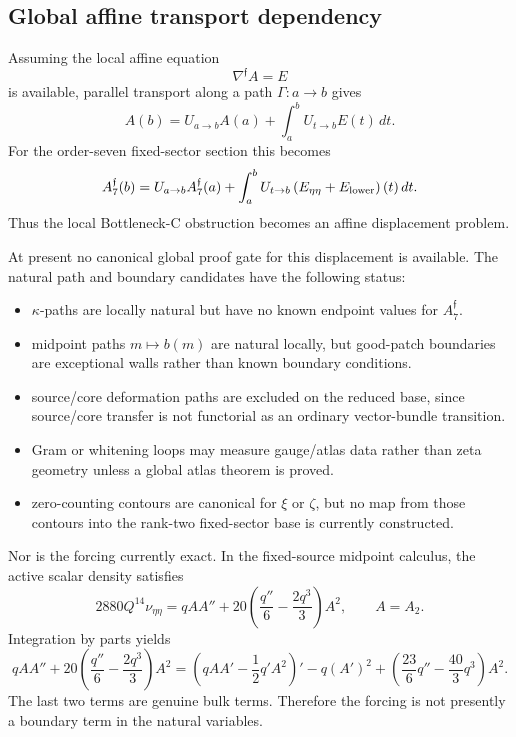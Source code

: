 \documentclass[11pt,a4paper]{amsart}
\theoremstyle{plain}
\theoremstyle{definition}
\begin{document}
\subsection{Global affine transport dependency}
\label{subsec:global-affine-transport-dependency}

Assuming the local affine equation
\[
\nabla^{\mathfrak f}A=E
\]
is available, parallel transport along a path \(\Gamma:a\to b\) gives
\[
A(b)
=
U_{a\to b}A(a)
+
\int_a^b U_{t\to b}E(t)\,dt.
\]
For the order-seven fixed-sector section this becomes
\[
A_7^{\mathfrak f}(b)
=
U_{a\to b}A_7^{\mathfrak f}(a)
+
\int_a^b
U_{t\to b}
\left(
E_{\eta\eta}+E_{\rm lower}
\right)(t)\,dt.
\]
Thus the local Bottleneck-C obstruction becomes an affine displacement
problem.

At present no canonical global proof gate for this displacement is available.
The natural path and boundary candidates have the following status:
\begin{itemize}
\item \(\kappa\)-paths are locally natural but have no known endpoint values for
\(A_7^{\mathfrak f}\).
\item midpoint paths \(m\mapsto b(m)\) are natural locally, but good-patch
boundaries are exceptional walls rather than known boundary conditions.
\item source/core deformation paths are excluded on the reduced base, since
source/core transfer is not functorial as an ordinary vector-bundle
transition.
\item Gram or whitening loops may measure gauge/atlas data rather than zeta
geometry unless a global atlas theorem is proved.
\item zero-counting contours are canonical for \(\xi\) or \(\zeta\), but no
map from those contours into the rank-two fixed-sector base is currently
constructed.
\end{itemize}

Nor is the forcing currently exact.  In the fixed-source midpoint calculus, the
active scalar density satisfies
\[
2880Q^{14}\nu_{\eta\eta}
=
qAA''
+
20
\left(
\frac{q''}{6}
-
\frac{2q^3}{3}
\right)A^2,
\qquad
A=A_2.
\]
Integration by parts yields
\[
qAA''
+
20
\left(
\frac{q''}{6}
-
\frac{2q^3}{3}
\right)A^2
=
\left(qAA'-\frac12 q'A^2\right)'
-
q(A')^2
+
\left(
\frac{23}{6}q''
-
\frac{40}{3}q^3
\right)A^2.
\]
The last two terms are genuine bulk terms.  Therefore the forcing is not
presently a boundary term in the natural variables.
\end{document}

